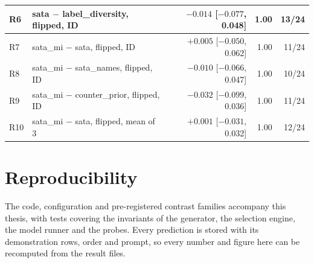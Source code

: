 \begin{table}[h]
\begin{tabular}{@{}llrrr@{}}
R6 & sata $-$ label\_diversity, flipped, ID & $-0.014$ [$-0.077$, 0.048] & 1.00 & 13/24 \\
\midrule
R7 & sata\_mi $-$ sata, flipped, ID & $+0.005$ [$-0.050$, 0.062] & 1.00 & 11/24 \\
R8 & sata\_mi $-$ sata\_names, flipped, ID & $-0.010$ [$-0.066$, 0.047] & 1.00 & 10/24 \\
R9 & sata\_mi $-$ counter\_prior, flipped, ID & $-0.032$ [$-0.099$, 0.036] & 1.00 & 11/24 \\
R10 & sata\_mi $-$ sata, flipped, mean of 3 & $+0.001$ [$-0.031$, 0.032] & 1.00 & 12/24 \\
\bottomrule
\end{tabular}
\end{table}

\section{Reproducibility}
\label{app:repro}

The code, configuration and pre-registered contrast families accompany this thesis, with tests covering the invariants of the generator, the selection engine, the model runner and the probes.
Every prediction is stored with its demonstration rows, order and prompt, so every number and figure here can be recomputed from the result files.
